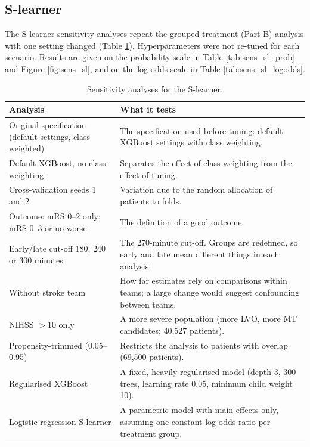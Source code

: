 \subsection{S-learner}\label{sec:sens_sl}

The S-learner sensitivity analyses repeat the grouped-treatment (Part B) analysis with one setting changed (Table \ref{tab:sens_analyses_sl}). Hyperparameters were not re-tuned for each scenario. Results are given on the probability scale in Table \ref{tab:sens_sl_prob} and Figure \ref{fig:sens_sl}, and on the log odds scale in Table \ref{tab:sens_sl_logodds}.

\begin{table}[htbp]
\centering
\footnotesize
\caption{Sensitivity analyses for the S-learner.}
\label{tab:sens_analyses_sl}
\begin{tabular}{@{}p{}p{}@{}}
\toprule
Analysis & What it tests \\
\midrule
Original specification (default settings, class weighted) & The specification used before tuning: default XGBoost settings with class weighting. \\
Default XGBoost, no class weighting & Separates the effect of class weighting from the effect of tuning. \\
Cross-validation seeds 1 and 2 & Variation due to the random allocation of patients to folds. \\
Outcome: mRS 0--2 only; mRS 0--3 or no worse & The definition of a good outcome. \\
Early/late cut-off 180, 240 or 300 minutes & The 270-minute cut-off. Groups are redefined, so early and late mean different things in each analysis. \\
Without stroke team & How far estimates rely on comparisons within teams; a large change would suggest confounding between teams. \\
NIHSS $>$10 only & A more severe population (more LVO, more MT candidates; 40,527 patients). \\
Propensity-trimmed (0.05--0.95) & Restricts the analysis to patients with overlap (69,500 patients). \\
Regularised XGBoost & A fixed, heavily regularised model (depth 3, 300 trees, learning rate 0.05, minimum child weight 10). \\
Logistic regression S-learner & A parametric model with main effects only, assuming one constant log odds ratio per treatment group. \\
\bottomrule
\end{tabular}
\end{table}

